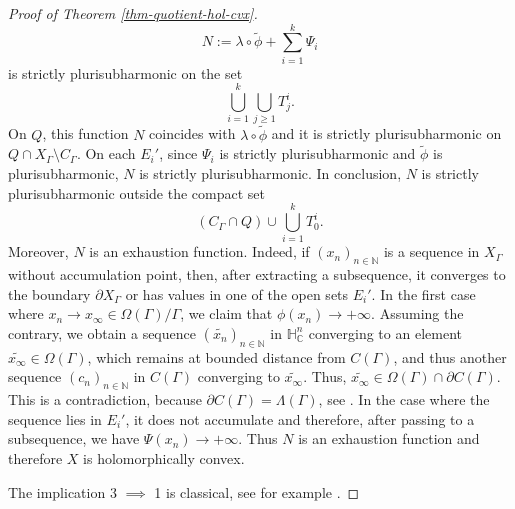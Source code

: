 \documentclass{article}
\theoremstyle{definition}
\theoremstyle{remark}
\newcommand{\C}{\mathbb{C}}
\newcommand{\N}{\mathbb{N}}
\newcommand{\HNC}{\mathbb{H}^{n}_{\C}}
\begin{document}
\begin{proof}[Proof of Theorem \ref{thm-quotient-hol-cvx}]
		\begin{equation*}
			N:= \lambda\circ\widetilde{\phi} + \sum_{i=1}^{k}\Psi_i
		\end{equation*}
		is strictly plurisubharmonic on the set
		\begin{equation*}
			\bigcup_{i=1}^{k}\bigcup_{j\ge1}T^{i}_{j}.
		\end{equation*}
		On $Q$, this function $N$ coincides with $\lambda\circ\widetilde{\phi}$ and it is strictly plurisubharmonic on $Q\cap X_{\Gamma}\setminus C_{\Gamma}$. On each $E_i'$, since $\Psi_i$ is strictly plurisubharmonic and $\widetilde{\phi}$ is plurisubharmonic, $N$ is strictly plurisubharmonic. In conclusion, $N$ is strictly plurisubharmonic outside the compact set
		\begin{equation*}
			(C_{\Gamma}\cap Q)\cup\bigcup_{i=1}^{k}T^{i}_{0}.
		\end{equation*}
		Moreover, $N$ is an exhaustion function. Indeed, if $(x_n)_{n\in \N}$ is a sequence in $X_{\Gamma}$ without accumulation point, then, after extracting a subsequence, it converges to the boundary $\partial X_{\Gamma}$ or has values in one of the open sets $E_i'$. In the first case where $x_n \longrightarrow x_{\infty}\in \Omega(\Gamma)/\Gamma$, we claim that $\phi(x_n)\longrightarrow +\infty$. Assuming the contrary, we obtain a sequence $(\widetilde{x_n})_{n\in \N}$ in $\HNC$ converging to an element $\widetilde{x_{\infty}}\in \Omega(\Gamma)$, which remains at bounded distance from $C(\Gamma)$, and thus another sequence $(c_n)_{n\in \N}$ in $C(\Gamma)$ converging to $\widetilde{x_{\infty}}$. Thus, $\widetilde{x_{\infty}}\in \Omega(\Gamma) \cap \partial C(\Gamma)$. This is a contradiction, because $\partial C(\Gamma)=\Lambda(\Gamma)$, see \cite{andersonDirichletProblemInfinity1983}. In the case where the sequence lies in $E_i'$, it does not accumulate and therefore, after passing to a subsequence, we have $\Psi(x_n)\to +\infty$. Thus $N$ is an exhaustion function and therefore $X$ is holomorphically convex.
		
		The implication 3 $\implies$ 1 is classical, see for example \cite[Theorem I.6.14]{demaillyComplexAnalyticDifferential-manuel}.
	\end{proof}
	
\end{document}
